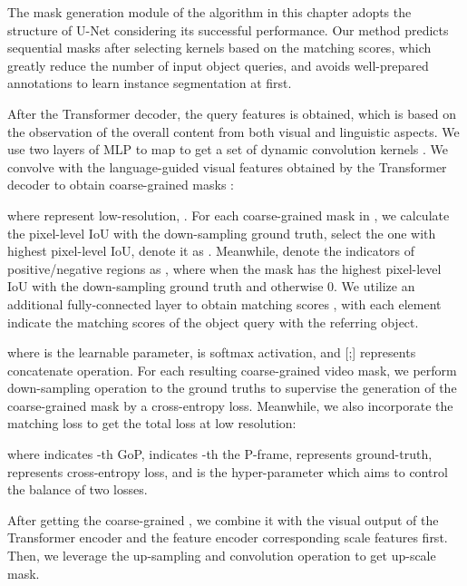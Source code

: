 \documentclass[sigconf]{acmart}
\begin{document}
The mask generation module of the algorithm in this chapter adopts the structure of U-Net\cite{ronneberger2015u} considering its successful performance. Our method predicts sequential masks after selecting kernels based on the matching scores, which greatly reduce the number of input object queries, and avoids well-prepared annotations to learn instance segmentation at first. 



After the Transformer decoder, the query features  is obtained, which is based on the observation of the overall content from both visual and linguistic aspects.
We use two layers of MLP to map  
to get a set of dynamic convolution kernels . We convolve  with the language-guided visual features  obtained by the Transformer decoder to obtain coarse-grained masks :

where  represent low-resolution, . For each coarse-grained mask in , we calculate the pixel-level IoU with the down-sampling ground truth, select the one with highest pixel-level IoU, denote it as . Meanwhile, denote the indicators of positive/negative regions as , where
 when the mask  has the highest pixel-level IoU with the down-sampling ground truth and otherwise 0. 
We utilize an additional fully-connected layer to obtain matching scores , with each element indicate the matching scores of the object query with the referring object.

where  is the learnable parameter,  is softmax activation, and [;] represents concatenate operation. For each resulting coarse-grained video mask, we perform down-sampling operation to the ground truths to supervise the generation of the coarse-grained mask by a cross-entropy loss. Meanwhile, we also incorporate the matching loss to get the total loss at low resolution:

where  indicates -th GoP,  indicates -th the P-frame,  represents ground-truth,  represents cross-entropy loss, and  is the hyper-parameter which aims to control the balance of two losses.


















After getting the coarse-grained , we combine it with the visual output of the Transformer encoder  and the feature encoder corresponding scale features first. Then, we leverage the up-sampling and convolution operation to get up-scale mask.
\end{document}
